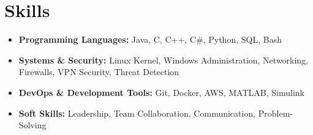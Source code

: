 \section{Skills}
\begin{itemize}
    \item \textbf{Programming Languages:} Java, C, C++, C#, Python, SQL, Bash  
    \item \textbf{Systems \& Security:} Linux Kernel, Windows Administration, Networking, Firewalls, VPN Security, Threat Detection  
    \item \textbf{DevOps \& Development Tools:} Git, Docker, AWS, MATLAB, Simulink  
    \item \textbf{Soft Skills:} Leadership, Team Collaboration, Communication, Problem-Solving  
\end{itemize}
